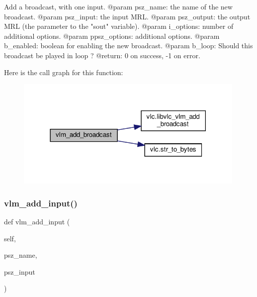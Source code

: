 \begin{DoxyVerb}Add a broadcast, with one input.
@param psz_name: the name of the new broadcast.
@param psz_input: the input MRL.
@param psz_output: the output MRL (the parameter to the "sout" variable).
@param i_options: number of additional options.
@param ppsz_options: additional options.
@param b_enabled: boolean for enabling the new broadcast.
@param b_loop: Should this broadcast be played in loop ?
@return: 0 on success, -1 on error.
\end{DoxyVerb}
 Here is the call graph for this function\+:
\nopagebreak
\begin{figure}[H]
\begin{center}
\leavevmode
\includegraphics[width=314pt]{classvlc_1_1_instance_a8ce4b26858673c7029810ca9c99b4e83_cgraph}
\end{center}
\end{figure}
\mbox{\label{classvlc_1_1_instance_ab52ce0a6d96b77def1fd4a2e451fe2d4}} 
\subsubsection{\texorpdfstring{vlm\+\_\+add\+\_\+input()}{vlm\_add\_input()}}
{\footnotesize\ttfamily def vlm\+\_\+add\+\_\+input (\begin{DoxyParamCaption}\item[{}]{self,  }\item[{}]{psz\+\_\+name,  }\item[{}]{psz\+\_\+input }\end{DoxyParamCaption})}

